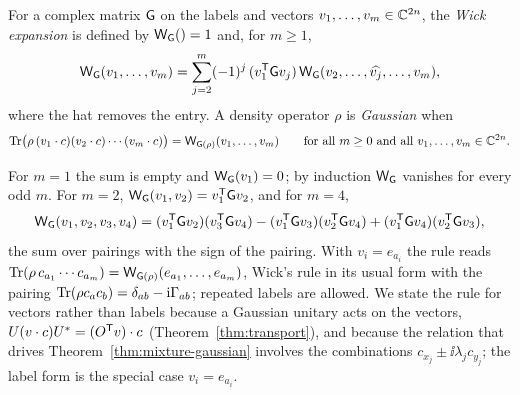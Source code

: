 \begin{definition}\label{def:wick}
For a complex matrix $\mathsf G$ on the labels and vectors $v_1,\ldots,v_m\in\mathbb C^{2n}$, the
\emph{Wick expansion} is defined by $\mathsf W_\mathsf G()=1$ and, for $m\geq1$,
\[
 \mathsf W_\mathsf G(v_1,\ldots,v_m)=\sum_{j=2}^m(-1)^j\,(v_1^{\mathsf T}\mathsf G v_j)\,
 \mathsf W_\mathsf G(v_2,\ldots,\widehat{v_j},\ldots,v_m),
\]
where the hat removes the entry. A density operator $\rho$ is \emph{Gaussian} when
\[
 \operatorname{Tr}\bigl(\rho\,(v_1\cdot c)(v_2\cdot c)\cdots(v_m\cdot c)\bigr)=\mathsf W_{\mathsf G(\rho)}(v_1,\ldots,v_m)
 \qquad\text{for all }m\geq0\text{ and all }v_1,\ldots,v_m\in\mathbb C^{2n}.
\]
\end{definition}
For $m=1$ the sum is empty and $\mathsf W_\mathsf G(v_1)=0$; by induction $\mathsf W_\mathsf G$ vanishes for every odd
$m$. For $m=2$, $\mathsf W_\mathsf G(v_1,v_2)=v_1^{\mathsf T}\mathsf G v_2$, and for $m=4$,
\[
 \mathsf W_\mathsf G(v_1,v_2,v_3,v_4)=(v_1^{\mathsf T}\mathsf G v_2)(v_3^{\mathsf T}\mathsf G v_4)-(v_1^{\mathsf T}\mathsf G v_3)(v_2^{\mathsf T}\mathsf G v_4)
 +(v_1^{\mathsf T}\mathsf G v_4)(v_2^{\mathsf T}\mathsf G v_3),
\]
the sum over pairings with the sign of the pairing.  With $v_i=e_{a_i}$ the rule reads
$\operatorname{Tr}(\rho\,c_{a_1}\cdots c_{a_m})=\mathsf W_{\mathsf G(\rho)}(e_{a_1},\ldots,e_{a_m})$, Wick's rule in its usual
form with the pairing $\operatorname{Tr}(\rho c_ac_b)=\delta_{ab}-\mathrm i\Gamma_{ab}$; repeated labels are allowed.
We state the rule for vectors rather than labels because a Gaussian unitary acts on the
vectors, $U(v\cdot c)U^*=(O^{\mathsf T}v)\cdot c$ (Theorem~\ref{thm:transport}), and because the
relation that drives Theorem~\ref{thm:mixture-gaussian} involves the combinations
$c_{x_j}\pm\ii\lambda_jc_{y_j}$; the label form is the special case $v_i=e_{a_i}$.

